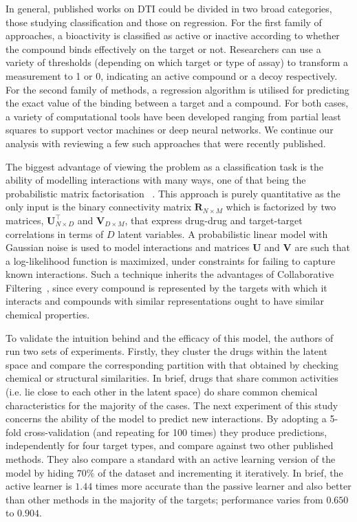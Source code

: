 \documentclass[10pt]{article}
\begin{document}
In general, published works on DTI could be divided in two broad categories, those studying classification and those on regression. For the first family of approaches, a bioactivity is classified as active or inactive according to whether the compound binds effectively on the target or not. Researchers can use a variety of thresholds (depending on which target or type of assay) to transform a measurement to 1 or 0, indicating an active compound or a decoy respectively. For the second family of methods, a regression algorithm is utilised for predicting the exact value of the binding between a target and a compound. For both cases, a variety of computational tools have been developed ranging from partial least squares to support vector machines or deep neural networks. We continue our analysis with reviewing a few such approaches that were recently published.  


The biggest advantage of viewing the problem as a classification task is the ability of modelling interactions with many ways, one of that being the probabilistic matrix factorisation ~\cite{cobanoglu2013predicting}. This approach is purely quantitative as the only input is the binary connectivity matrix $\mathbf{R}_{N\times M}$ which is factorized by two matrices,  $\mathbf{U}_{N\times D}^\top$ and  $\mathbf{V}_{D\times M}$, that express drug-drug and target-target correlations in terms of $D$ latent variables. A probabilistic linear model with Gaussian noise is used to model interactions and matrices  $\mathbf{U}$ and $\mathbf{V}$ are such that a log-likelihood function is maximized, under constraints for failing to capture known interactions. Such a technique inherits the advantages of Collaborative Filtering~\cite{sarwar2001item}, since every compound is represented by the targets with which it interacts and compounds with similar representations ought to have similar chemical properties. 

To validate the intuition behind and the efficacy of this model, the authors of~\cite{cobanoglu2013predicting} run two sets of experiments. Firstly, they cluster the drugs within the latent space and compare the corresponding partition with that obtained by checking chemical or structural similarities. In brief, drugs that share common activities (i.e. lie close to each other in the latent space) do share common chemical characteristics for the majority of the cases. The next experiment of this study concerns the ability of the model to predict new interactions. By adopting a 5-fold cross-validation (and repeating for 100 times) they produce predictions, independently for four target types, and compare against two other published methods. They also compare a standard with an active learning version of the model by hiding $70\%$ of the dataset and incrementing it iteratively. In brief, the active learner is $1.44$ times more accurate than the passive learner and also better than other methods in the majority of the targets; performance varies from $0.650$ to $0.904$. 
\end{document}
